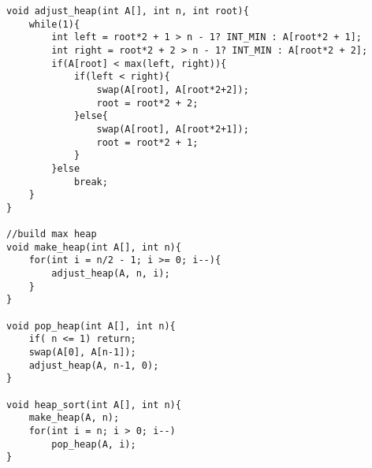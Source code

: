     
\begin{lstlisting}
void adjust_heap(int A[], int n, int root){
	while(1){
		int left = root*2 + 1 > n - 1? INT_MIN : A[root*2 + 1];
		int right = root*2 + 2 > n - 1? INT_MIN : A[root*2 + 2];
		if(A[root] < max(left, right)){
			if(left < right){
				swap(A[root], A[root*2+2]);
				root = root*2 + 2;
			}else{
				swap(A[root], A[root*2+1]);
				root = root*2 + 1;
			}
		}else
			break;
	}
}

//build max heap
void make_heap(int A[], int n){
	for(int i = n/2 - 1; i >= 0; i--){
		adjust_heap(A, n, i);
	}
}

void pop_heap(int A[], int n){
	if( n <= 1)	return;
	swap(A[0], A[n-1]);
	adjust_heap(A, n-1, 0);
}

void heap_sort(int A[], int n){
	make_heap(A, n);
	for(int i = n; i > 0; i--)
		pop_heap(A, i);
}
\end{lstlisting}
